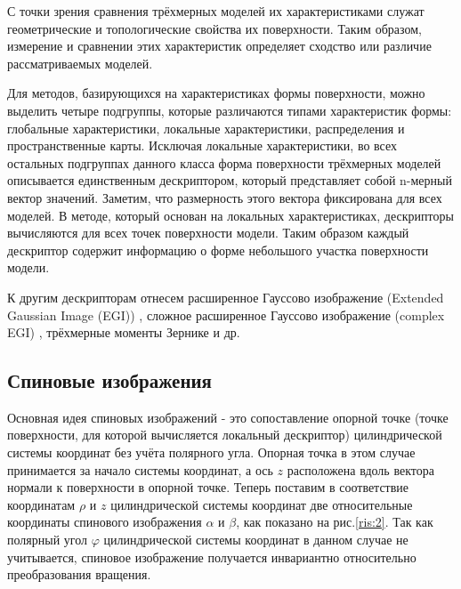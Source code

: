 \documentclass[14pt]{article}
\numberwithin{figure}{section}
\numberwithin{equation}{section}
\begin{document}
С точки зрения сравнения трёхмерных моделей их характеристиками служат геометрические и топологические свойства их поверхности. Таким образом, измерение и сравнении этих характеристик определяет сходство или различие рассматриваемых моделей.

Для методов, базирующихся на характеристиках формы поверхности, можно выделить четыре подгруппы, которые различаются типами характеристик формы: глобальные характеристики, локальные характеристики, распределения и пространственные карты. Исключая локальные характеристики, во всех остальных подгруппах данного класса форма поверхности трёхмерных моделей описывается единственным дескриптором, который представляет собой n-мерный вектор значений. Заметим, что размерность этого вектора фиксирована для всех моделей. В методе, который основан на локальных характеристиках, дескрипторы вычисляются для всех точек поверхности модели. Таким образом каждый дескриптор содержит информацию о форме небольшого участка поверхности модели.

К другим дескрипторам отнесем расширенное Гауссово изображение (Extended Gaussian Image (EGI)) \cite{Horn}, сложное расширенное Гауссово изображение (complex EGI) \cite{Kang}, трёхмерные моменты Зернике \cite{Novotni} и др.

\subsection{Спиновые изображения}

Основная идея спиновых изображений - это сопоставление опорной точке (точке поверхности, для которой вычисляется локальный дескриптор) цилиндрической системы координат без учёта полярного угла. Опорная точка в этом случае принимается за начало системы координат, а ось $z$ расположена вдоль вектора нормали к поверхности в опорной точке. Теперь поставим в соответствие координатам $\rho$ и $z$ цилиндрической системы координат две относительные координаты спинового изображения $\alpha$ и $\beta$, как показано на рис.\ref{ris:2}. Так как полярный угол $\varphi$ цилиндрической системы координат в данном случае не учитывается, спиновое изображение получается инвариантно относительно преобразования вращения.
\end{document}
